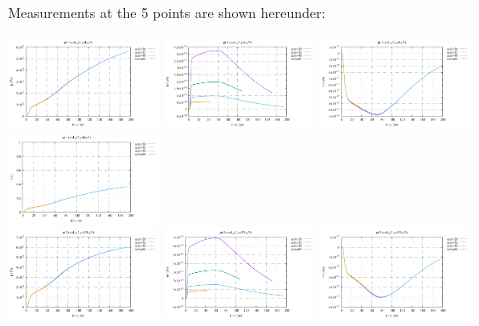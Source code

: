 \newpage
Measurements at the 5 points are shown hereunder:
\begin{center}
\includegraphics[width=4cm]{python_codes/fieldstone_126/results/model3/pt1_p.pdf}
\includegraphics[width=4cm]{python_codes/fieldstone_126/results/model3/pt1_u.pdf}
\includegraphics[width=4cm]{python_codes/fieldstone_126/results/model3/pt1_v.pdf}
\includegraphics[width=4cm]{python_codes/fieldstone_126/results/model3/pt1_Ovp.pdf}\\
\includegraphics[width=4cm]{python_codes/fieldstone_126/results/model3/pt2_p.pdf}
\includegraphics[width=4cm]{python_codes/fieldstone_126/results/model3/pt2_u.pdf}
\includegraphics[width=4cm]{python_codes/fieldstone_126/results/model3/pt2_v.pdf}

\end{center}
